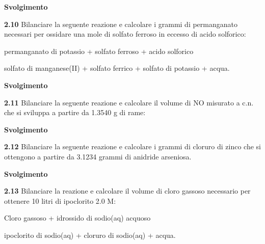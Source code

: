 \large\textbf{Svolgimento}\normalsize

\vspace{0.2cm}

\vspace{0.2cm}\textbf{2.10} Bilanciare la seguente reazione e calcolare i grammi di permanganato necessari per ossidare una
mole di solfato ferroso in eccesso di acido solforico:

\begin{center}
permanganato di potassio + solfato ferroso + acido solforico \ce{->}

\ce{->}solfato di manganese(II) + solfato ferrico + solfato di potassio + acqua.
\end{center}

\large\textbf{Svolgimento}\normalsize

\vspace{0.2cm}

\vspace{0.2cm}\textbf{2.11} Bilanciare la seguente reazione e calcolare il volume di NO misurato a c.n. che si sviluppa a
partire da 1.3540 g di rame:

\begin{center}
\end{center}

\large\textbf{Svolgimento}\normalsize

\vspace{0.2cm}

\vspace{0.2cm}\textbf{2.12} Bilanciare la seguente reazione e calcolare i grammi di cloruro di zinco che si ottengono a partire da 3.1234 grammi di anidride arseniosa.

\begin{center}
\end{center}

\large\textbf{Svolgimento}\normalsize

\vspace{0.2cm}

\vspace{0.2cm}\textbf{2.13} Bilanciare la reazione e calcolare il volume di cloro gassoso necessario per ottenere 10 litri di ipoclorito 2.0 M:

\begin{center}
    Cloro gassoso + idrossido di sodio(aq) acquoso \ce{->} 
    
    \ce{->} ipoclorito di sodio(aq) + cloruro di sodio(aq) + acqua. 
\end{center}


